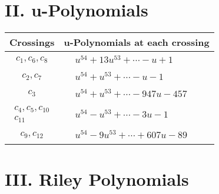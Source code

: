 \documentclass[1p]{elsarticle_modified}
\theoremstyle{definition}
\begin{document}
\newpage\renewcommand{\arraystretch}{1}
\centering \section*{ II. u-Polynomials}
\begin{tabular}{m{50pt}|m{274pt}}
Crossings & \hspace{64pt}u-Polynomials at each crossing \\
\hline $$\begin{aligned}c_{1},c_{6},c_{8}\end{aligned}$$&$\begin{aligned}
&u^{54}+13 u^{53}+\cdots- u+1
\end{aligned}$\\
\hline $$\begin{aligned}c_{2},c_{7}\end{aligned}$$&$\begin{aligned}
&u^{54}+u^{53}+\cdots- u-1
\end{aligned}$\\
\hline $$\begin{aligned}c_{3}\end{aligned}$$&$\begin{aligned}
&u^{54}+u^{53}+\cdots-947 u-457
\end{aligned}$\\
\hline $$\begin{aligned}c_{4},c_{5},c_{10}\\c_{11}\end{aligned}$$&$\begin{aligned}
&u^{54}- u^{53}+\cdots-3 u-1
\end{aligned}$\\
\hline $$\begin{aligned}c_{9},c_{12}\end{aligned}$$&$\begin{aligned}
&u^{54}-9 u^{53}+\cdots+607 u-89
\end{aligned}$\\
\hline
\end{tabular}\newpage\renewcommand{\arraystretch}{1}
\centering \section*{ III. Riley Polynomials}
\end{document}
